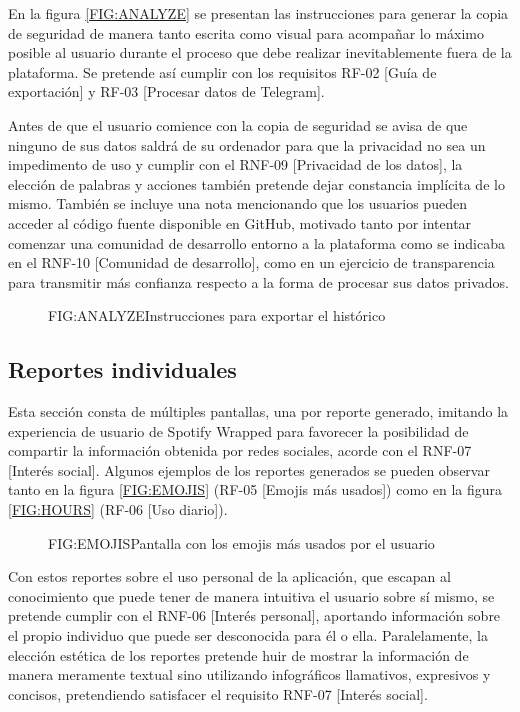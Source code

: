 En la figura \ref{FIG:ANALYZE} se presentan las instrucciones para generar la copia de seguridad de manera tanto escrita como visual para acompañar lo máximo posible al usuario durante el proceso que debe realizar inevitablemente fuera de la plataforma. Se pretende así cumplir con los requisitos RF-02 [Guía de exportación] y RF-03 [Procesar datos de Telegram].

Antes de que el usuario comience con la copia de seguridad se avisa de que ninguno de sus datos saldrá de su ordenador para que la privacidad no sea un impedimento de uso y cumplir con el RNF-09 [Privacidad de los datos], la elección de palabras y acciones también pretende dejar constancia implícita de lo mismo. También se incluye una nota mencionando que los usuarios pueden acceder al código fuente disponible en GitHub, motivado tanto por intentar comenzar una comunidad de desarrollo entorno a la plataforma como se indicaba en el RNF-10 [Comunidad de desarrollo], como en un ejercicio de transparencia para transmitir más confianza respecto a la forma de procesar sus datos privados.

\begin{figure}[]{FIG:ANALYZE}{Instrucciones para exportar el histórico}
\end{figure}

\subsection{Reportes individuales}

Esta sección consta de múltiples pantallas, una por reporte generado, imitando la experiencia de usuario de Spotify Wrapped para favorecer la posibilidad de compartir la información obtenida por redes sociales, acorde con el RNF-07 [Interés social]. Algunos ejemplos de los reportes generados se pueden observar tanto en la figura \ref{FIG:EMOJIS} (RF-05 [Emojis más usados]) como en la figura \ref{FIG:HOURS} (RF-06 [Uso diario]).

\begin{figure}[]{FIG:EMOJIS}{Pantalla con los emojis más usados por el usuario}
\end{figure}

Con estos reportes sobre el uso personal de la aplicación, que escapan al conocimiento que puede tener de manera intuitiva el usuario sobre sí mismo, se pretende cumplir con el RNF-06 [Interés personal], aportando información sobre el propio individuo que puede ser desconocida para él o ella. Paralelamente, la elección estética de los reportes pretende huir de mostrar la información de manera meramente textual sino utilizando infográficos llamativos, expresivos y concisos, pretendiendo satisfacer el requisito RNF-07 [Interés social].

